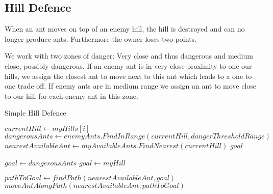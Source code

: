 \subsection{Hill Defence}
When an ant moves on top of an enemy hill, the hill is destroyed and can no longer produce ants. Furthermore the owner loses two points.

We work with two zones of danger: Very close and thus dangerous and medium close, possibly dangerous. If an enemy ant is in very close proximity to one our hills, we assign the closest ant to move next to this ant which leads to a one to one trade off. If enemy ants are in medium range we assign an ant to move close to our hill for each enemy ant in this zone.

\begin{algorithm}
\caption{Simple Hill Defence}
\label{alg:simplehilldefence}
\begin{algorithmic}
\STATE $currentHill \gets myHills[i]$
\STATE $dangerousAnts \gets enemyAnts.FindInRange(currentHill, dangerThresholdRange)$
	\STATE $nearestAvailableAnt \gets myAvailableAnts.FindNearest(currentHill)$
	\STATE $goal$

	
		\STATE $goal \gets dangerousAnts$
	\ELSE
		\STATE $goal \gets myHill$
	\ENDIF

	\STATE $pathToGoal \gets findPath(nearestAvailableAnt, goal)$
	\STATE $moveAntAlongPath(nearestAvailableAnt, pathToGoal)$
	\ENDFOR
\ENDFOR
\end{algorithmic}
\end{algorithm}